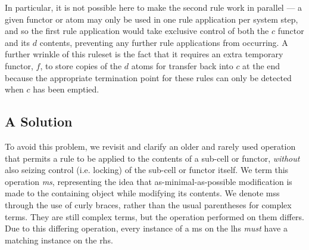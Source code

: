 In particular, it is not possible here to make the second rule work in parallel --- a given functor or atom may only be used in one rule application per system step, and so the first rule application would take exclusive control of both the \(c\) functor and its \(d\) contents, preventing any further rule applications from occurring.  A further wrinkle of this \gls{ruleset} is the fact that it requires an extra temporary functor, \(f\), to store copies of the \(d\) atoms for transfer back into \(c\) at the end because the appropriate termination point for these rules can only be detected when \(c\) has been emptied.

\subsection{A Solution}
To avoid this problem, we revisit and clarify an older and rarely used operation that permits a rule to be applied to the contents of a sub-cell or functor, \emph{without} also seizing control (i.e. locking) of the sub-cell or functor itself.  We term this operation \emph{\gls{ms}}, representing the idea that as-minimal-as-possible modification is made to the containing object while modifying its contents.  We denote \glspl{ms} through the use of curly braces, rather than the usual parentheses for complex terms.  They are still complex terms, but the operation performed on them differs.  Due to this differing operation, every instance of a \gls{ms} on the \gls{lhs} \emph{must} have a matching instance on the \gls{rhs}.




\begin{cprulesetfloat}
    \begin{cpruleset}

    \end{cpruleset}
    \caption{\label{rules:cps:microsurg}Rules for a destructive multiplication process that requires exactly two steps regardless of the numbers multiplied by using \gls{cps} \glspl{ms}}
\end{cprulesetfloat}

